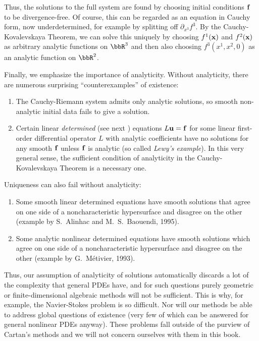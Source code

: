 \begin{example}
    Thus, the solutions to the full system are found by choosing initial conditions $\bf{f}$ to be divergence-free. Of course, this can be regarded as an equation in Cauchy form, now underdetermined, for example by splitting off $\partial_{x^3}f^3$. By the Cauchy-Kovalevskaya Theorem, we can solve this uniquely by choosing $f^1(\bf{x})$ and $f^2(\bf{x})$ as arbitrary analytic functions on $\bbR^3$ and then also choosing $f^3(x^1,x^2,0)$ as an analytic function on $\bbR^2$.
\end{example}


Finally, we emphasize the importance of analyticity. Without analyticity, there are numerous surprising ``counterexamples'' of existence:
\begin{enumerate}
    \item The Cauchy-Riemann system admits only analytic solutions, so smooth non-analytic initial data fails to give a solution.
    \item Certain linear \emph{determined} (see next \sect) equations $L\bf{u}=\bf{f}$ for some linear first-order differential operator $L$ with analytic coefficients have no solutions for any smooth $\bf{f}$ unless $\bf{f}$ is analytic (so called \emph{Lewy's example}). In this very general sense, the sufficient condition of analyticity in the Cauchy-Kovalevskaya Theorem is a necessary one.
\end{enumerate}
Uniqueness can also fail without analyticity:
\begin{enumerate}
    \item Some smooth linear determined equations have smooth solutions that agree on one side of a noncharacteristic hypersurface and disagree on the other (example by S.~Alinhac and M.~S.~Baouendi, 1995).
    \item Some analytic nonlinear determined equations have smooth solutions which agree on one side of a noncharacteristic hypersurface and disagree on the other (example by G.~M\'etivier, 1993).
\end{enumerate}

Thus, our assumption of analyticity of solutions automatically discards a lot of the complexity that general PDEs have, and for such questions purely geometric or finite-dimensional algebraic methods will not be sufficient. This is why, for example, the Navier-Stokes problem is so difficult. Nor will our methods be able to address global questions of existence (very few of which can be answered for general nonlinear PDEs anyway). These problems fall outside of the purview of Cartan's methods and we will not concern ourselves with them in this book.









